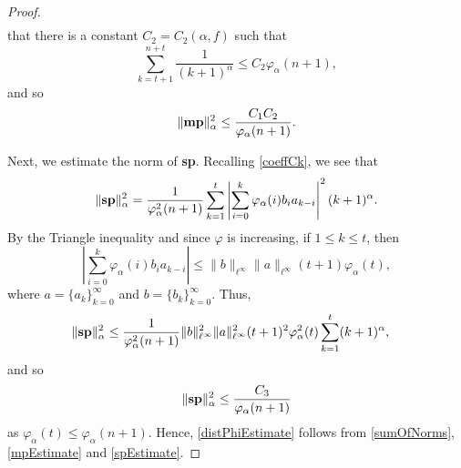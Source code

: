 \documentclass[11 pt,reqno]{amsart}
\theoremstyle{definition}
\theoremstyle{remark}
\numberwithin{equation}{section} \numberwithin{figure}{section}
\begin{document}
\begin{proof}
\begin{equation*}
\begin{array}{ll}
                        \end{array}
            \end{equation*}
            that there is a constant $C_{2}=C_{2}(\alpha,f)$ such that
            \begin{equation}\label{sumEstimate}
                        \sum_{k=t+1}^{n+t}\frac{1}{(k+1)^{\alpha}}
                        \leq C_{2}\varphi_{\alpha}(n+1),
            \end{equation}
            and so
            \begin{equation}\label{mpEstimate}
                        \|{\bf mp}\|^2_\alpha\leq\frac{C_{1}C_{2}}{\varphi_{\alpha}(n+1)}.
            \end{equation}

            Next, we estimate the norm of {\bf sp}.  Recalling \eqref{coeffCk}, we see that
            \[  \|{\bf sp}\|^2_\alpha
                        =\frac{1}{\varphi_{\alpha}^{2}(n+1)}\sum_{k=1}^t \left|\sum_{i=0}^k
                        \varphi_{\alpha}(i)b_{i}a_{k-i}\right|^2 (k+1)^\alpha.  \]
            By the Triangle inequality and since $\varphi$ is increasing, if $1\leq k\leq t$, then
            \begin{equation}\label{triangleIneqEstimate}
                        \left|\sum_{i=0}^k \varphi_{\alpha}(i)b_{i}a_{k-i}\right|
                        \leq\|b\|_{\ell^{\infty}}\|a\|_{\ell^{\infty}}(t+1)\varphi_{\alpha}(t),
            \end{equation}
            where  $a=\{a_{k}\}_{k=0}^{\infty}$ and $b=\{b_{k}\}_{k=0}^{\infty}$.  Thus,
            \begin{align*}
                        \|{\bf sp}\|^2_\alpha
                        &\leq\frac{1}{\varphi_{\alpha}^{2}(n+1)}\|b\|_{\ell^{\infty}}^{2}
                        \|a\|_{\ell^{\infty}}^{2}(t+1)^{2}\varphi_{\alpha}^{2}(t)
                        \sum_{k=1}^t (k+1)^{\alpha},
            \end{align*}
            and so
            \begin{equation}\label{spEstimate}
                        \|{\bf sp}\|^2_\alpha\leq\frac{C_{3}}{\varphi_{\alpha}(n+1)}
            \end{equation}
            as $\varphi_{\alpha}(t)\leq\varphi_{\alpha}(n+1)$.
            Hence, \eqref{distPhiEstimate} follows from \eqref{sumOfNorms},
            \eqref{mpEstimate} and \eqref{spEstimate}.


\end{proof}
\end{document}
